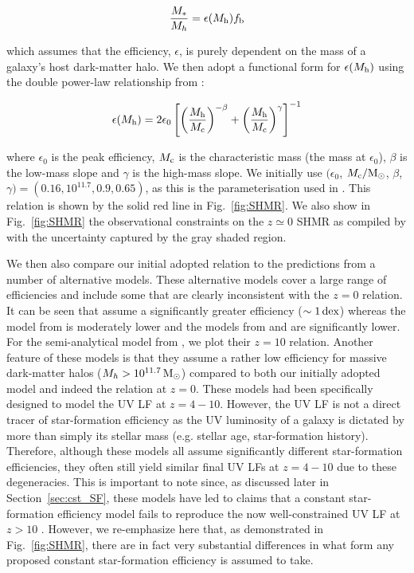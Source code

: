 \documentclass[fleqn,usenatbib]{mnras}
\begin{document}
\begin{equation}
    \frac{M_{*}}{M_{h}} = \epsilon(M_{\rm h}) f_{\rm b}
\end{equation}

\noindent
which assumes that the efficiency, $\epsilon$, is purely dependent on the mass of a galaxy's host dark-matter halo. We then adopt a functional form for $\epsilon(M_{\rm h})$ using the double power-law relationship from \citet{tacchella2018}:

\begin{equation}
\label{eq:dpl_eff}
    \epsilon(M_{\rm h}) = 2\epsilon_0 \left[ \left(\frac{M_{\rm h}}{M_{\rm c}}\right)^{-\beta} + \left(\frac{M_{\rm h}}{M_{\rm c}}\right)^{\gamma} \right]^{-1}
\end{equation}

\noindent
where $\epsilon_0$ is the peak efficiency, $M_{\rm c}$ is the characteristic mass (the mass at $\epsilon_0$), $\beta$ is the low-mass slope and $\gamma$ is the high-mass slope. We initially use $(\epsilon_0$, $M_{\rm c} / \rm M_{\odot}$, $\beta$, $\gamma) = (0.16, 10^{11.7}, 0.9, 0.65)$, as this is the parameterisation used in \citet{donnan2024}. This relation is shown by the solid red line in Fig.~\ref{fig:SHMR}. We also show in Fig.~\ref{fig:SHMR} the observational constraints on the $z \simeq 0$ SHMR as compiled by \citet{wechsler2018} with the uncertainty captured by the gray shaded region.

We then also compare our initial adopted relation to the predictions from a number of alternative models. These alternative models cover a large range of efficiencies and include some that are clearly inconsistent with the $z=0$ relation. It can be seen that \citet{tacchella2018} assume a significantly greater efficiency ($\sim 1\, \rm{dex}$) whereas the model from \citet{mason2015} is moderately lower and the models from \citet{sun2016} and \citet{harikane2022} are significantly lower. For the semi-analytical model from \citet{yung2019}, we plot their $z=10$ relation. Another feature of these models is that they assume a rather low efficiency for massive dark-matter halos ($M_{h}>10^{11.7}\, \rm M_{\odot}$) compared to both our initially adopted model and indeed the relation at $z=0$.  These models had been specifically designed to model the UV LF at $z=4-10$. However, the UV LF is not a direct tracer of star-formation efficiency as the UV luminosity of a galaxy is dictated by more than simply its stellar mass (e.g. stellar age, star-formation history). Therefore, although these models all assume significantly different star-formation efficiencies, they often still yield similar final UV LFs at $z=4-10$ due to these degeneracies. This is important to note since, as discussed later in Section~\ref{sec:cst_SF}, these models have led to claims that a constant star-formation efficiency model fails to reproduce the now well-constrained UV LF at $z>10$ \citep[e.g.][]{harikane2023a,tacchella2024}. However, we re-emphasize here that, as demonstrated in Fig.~\ref{fig:SHMR}, there are in fact very substantial differences in what form any proposed constant star-formation efficiency is assumed to take. 
\end{document}
